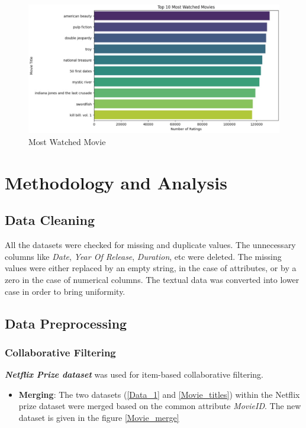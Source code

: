 \documentclass[a4paper,10pt]{article}
\begin{document}
\begin{figure} [H]
    \centering
    \includegraphics[width=15 cm]{figures/most_watched.png}
    \caption{Most Watched Movie}
    \label{most watched}
\end{figure}

\section{Methodology and Analysis}

\subsection{Data Cleaning}

All the datasets were checked for missing and duplicate values. 
The unnecessary columns like \textit{Date}, \textit{Year Of Release}, \textit{Duration}, etc were deleted. The missing values were either replaced by an empty string, in the case of attributes, or by a zero in the case of numerical columns.  
The textual data was converted into lower case in order to bring uniformity.

\subsection{Data Preprocessing}

\subsubsection{Collaborative Filtering}
\textit{\textbf{Netflix Prize dataset}} was used for item-based collaborative filtering. 
\begin{itemize}
    \item \textbf{Merging}: The two datasets (\ref{Data_1} and \ref{Movie_titles}) within the Netflix prize dataset were merged based on the common attribute \textit{MovieID}. The new dataset is given in the figure \ref{Movie_merge}
\end{itemize}
\end{document}
